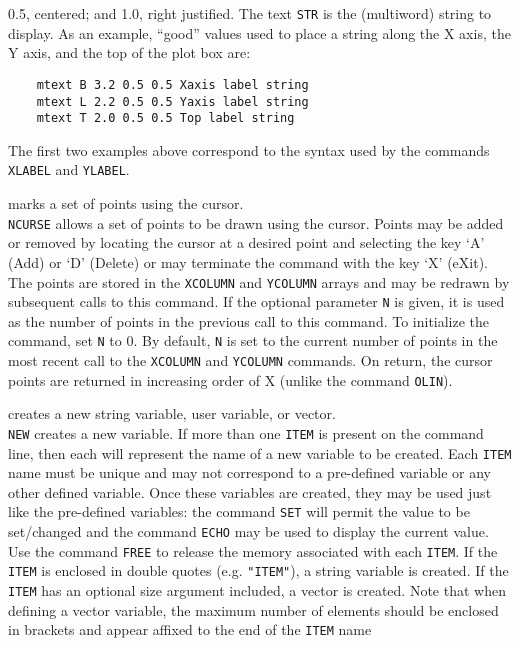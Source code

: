 	0.5, centered; and 1.0, right justified.  The text {\tt STR}
	is the (multiword) string to display.
	As an example, ``good'' values used to place a string along the X
	axis, the Y axis, and the top of the plot box are:
	\begin{verbatim}
    mtext B 3.2 0.5 0.5 Xaxis label string
    mtext L 2.2 0.5 0.5 Yaxis label string
    mtext T 2.0 0.5 0.5 Top label string
	\end{verbatim}
	The first two examples above correspond to the syntax used by
	the commands {\tt XLABEL} and
	{\tt YLABEL}.
\item [{\tt NCURSE [n] } --] marks a set of points using the cursor.\\
	{\tt NCURSE} allows a set of points to be drawn using the
	cursor.  Points may be added or removed by locating the cursor
	at a desired point and selecting the key `A' (Add) or `D' (Delete)
	or may terminate the command with the key `X' (eXit).  The points
	are stored in the {\tt XCOLUMN} and
	{\tt YCOLUMN} arrays and may be redrawn
	by subsequent calls to this command.  If the optional parameter
	{\tt N} is given, it is used as the number of points in the
	previous call to this command.  To initialize the command, set
	{\tt N} to 0.  By default, {\tt N} is set to the
	current number of points in the most recent call to the
	{\tt XCOLUMN} and
	{\tt YCOLUMN} commands.  On return,
	the cursor points are returned in increasing order of X (unlike
	the command {\tt OLIN}).
\item [{\tt NEW item [\dots] } --] creates a new string variable, user variable, or vector.\\
	{\tt NEW} creates a new variable.  If more than one
	{\tt ITEM} is present on the command line, then each will
	represent the name of a new variable to be created.  Each
	{\tt ITEM} name must be unique and may not correspond
	to a pre-defined variable or any other defined variable.  Once
	these variables are created, they may be used just like the
	pre-defined variables:  the command {\tt SET}
	will permit the value to be set/changed and the command
	{\tt ECHO} may be used to display the
	current value.  Use the command {\tt FREE}
	to release the memory associated with each {\tt ITEM}.  If
	the {\tt ITEM} is enclosed in double quotes
	(e.g. {\tt "ITEM"}), a string variable is created.  If the
	{\tt ITEM} has an optional size argument included, a vector
	is created.  Note that when defining a vector variable, the
	maximum number of elements should be enclosed in brackets and
	appear affixed to the end of the {\tt ITEM} name
